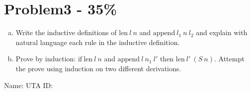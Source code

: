 \documentclass{article}
\newcommand{\answerbox}{
    \vspace{7cm} %
}
\newcommand{\answerboxbig}{
    \vspace{20cm} %
}
\newcommand{\studentinfo}{
    \noindent Name: \underline{\hspace{5cm}} UTA ID: \underline{\hspace{5cm}}\\
    \vspace{0.5cm} %
}
\begin{document}
\section*{Problem3 - 35\%}

\begin{enumerate}[(a)]
    \item Write the inductive definitions of \( \text{len} \ l \ n \) and \( \text{append} \ l_1 \ n \ l_2 \) and explain with natural language each rule in the inductive definition.
    \answerbox

    \item Prove by induction: \( \text{if} \ \text{len} \ l \ n \) and \( \text{append} \ l \ n_1 \ l' \) then \( \text{len} \ l' \ (S \ n) \). Attempt the prove using induction on two different derivations.
    \answerboxbig

\end{enumerate}

\studentinfo
\end{document}
